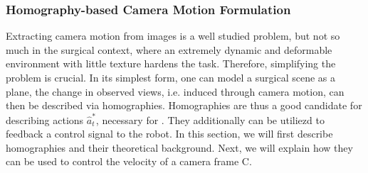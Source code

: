 \subsubsection{Homography-based Camera Motion Formulation}
\label{in:sec:homography_based_camera_motion_formulation}
Extracting camera motion from images is a well studied problem, but not so much in the surgical context, where an extremely dynamic and deformable environment with little texture hardens the task. Therefore, simplifying the problem is crucial. In its simplest form, one can model a surgical scene as a plane, the change in observed views, i.e. induced through camera motion, can then be described via homographies. Homographies are thus a good candidate for describing actions $\hat{a}^*_t$, necessary for . They additionally can be utiliezd to feedback a control signal to the robot. In this section, we will first describe homographies and their theoretical background. Next, we will explain how they can be used to control the velocity of a camera frame C. 


